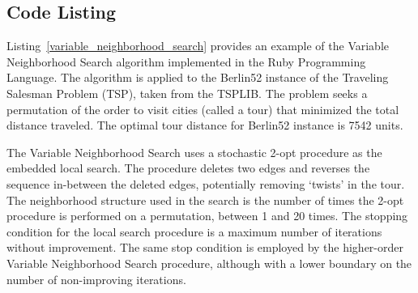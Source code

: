 \subsection{Code Listing}
Listing~\ref{variable_neighborhood_search} provides an example of the Variable Neighborhood Search algorithm implemented in the Ruby Programming Language. 
The algorithm is applied to the Berlin52 instance of the Traveling Salesman Problem (TSP), taken from the TSPLIB. The problem seeks a permutation of the order to visit cities (called a tour) that minimized the total distance traveled. The optimal tour distance for Berlin52 instance is 7542 units.

The Variable Neighborhood Search uses a stochastic 2-opt procedure as the embedded local search. The procedure deletes two edges and reverses the sequence in-between the deleted edges, potentially removing `twists' in the tour. The neighborhood structure used in the search is the number of times the 2-opt procedure is performed on a permutation, between 1 and 20 times. The stopping condition for the local search procedure is a maximum number of iterations without improvement. The same stop condition is employed by the higher-order Variable Neighborhood Search procedure, although with a lower boundary on the number of non-improving iterations.



